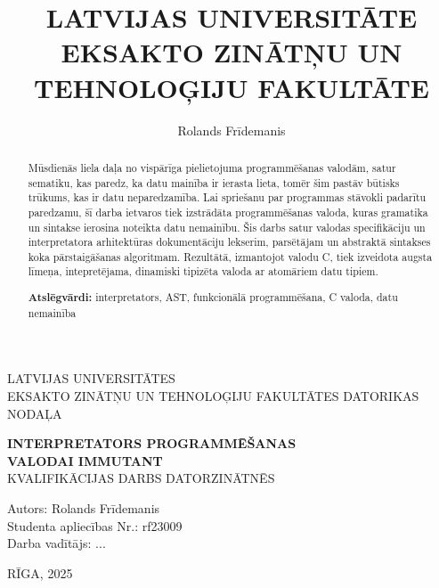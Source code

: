 \documentclass[12pt,a4paper]{report}
\title{LATVIJAS UNIVERSITĀTE
EKSAKTO ZINĀTŅU UN TEHNOLOĢIJU FAKULTĀTE}
\author{Rolands Frīdemanis}
\begin{document}
\begin{titlepage}
    \centering
    
    {\Large LATVIJAS UNIVERSITĀTES\\EKSAKTO ZINĀTŅU UN TEHNOLOĢIJU FAKULTĀTES DATORIKAS NODAĻA\\[5cm]}
    
    {\LARGE \textbf{ INTERPRETATORS PROGRAMMĒŠANAS\\[0.3cm] VALODAI IMMUTANT}}\\[0.5cm]

    \normalsize{KVALIFIKĀCIJAS DARBS DATORZINĀTNĒS}\\[5cm]
    
    \begin{flushleft}
        Autors: Rolands Frīdemanis\\
        Studenta apliecības Nr.: rf23009\\
        Darba vadītājs: ...
    \end{flushleft}
    
    \vfill
    RĪGA, 2025
\end{titlepage}

\begin{abstract}
    Mūsdienās liela daļa no vispārīga pielietojuma programmēšanas valodām, satur sematiku, kas paredz, ka datu mainība ir ierasta lieta, tomēr šim pastāv būtisks trūkums, kas ir datu neparedzamība.
    Lai spriešanu par programmas stāvokli padarītu paredzamu, šī darba ietvaros tiek izstrādāta programmēšanas valoda, kuras gramatika un sintakse ierosina noteikta datu nemainību.
    Šis darbs satur valodas specifikāciju un interpretatora arhitektūras dokumentāciju lekserim, parsētājam un abstraktā sintakses koka pārstaigāšanas algoritmam.
    Rezultātā, izmantojot valodu C, tiek izveidota augsta līmeņa, intepretējama, dinamiski tipizēta valoda ar atomāriem datu tipiem.

    \begin{flushleft}
    \textbf{Atslēgvārdi:} interpretators, AST, funkcionālā programmēšana, C valoda, datu nemainība
    \end{flushleft}
\end{abstract} 
\end{document}
